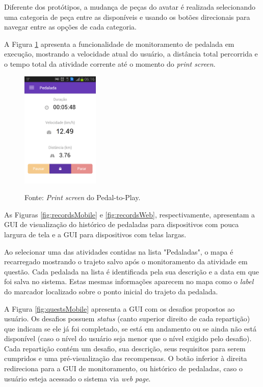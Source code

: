 Diferente dos protótipos, a mudança de peças do avatar é realizada selecionando uma categoria de peça entre as disponíveis e usando os botões direcionais para navegar entre as opções de cada categoria.
\par
A Figura \ref{fig:trackingMobile} apresenta a funcionalidade de monitoramento de pedalada em execução, mostrando a velocidade atual do usuário, a distância total percorrida e o tempo total da atividade corrente até o momento do \textit{print screen}.

\begin{figure}[h]
\begin{minipage}{1.0\textwidth}
    \centerline{\includegraphics[width=10em]{figuras/p2pTracking.png}}
    \label{fig:trackingMobile}
\end{minipage}
\centerline{Fonte: \textit{Print screen} do Pedal-to-Play.}
\end{figure}

As Figuras \ref{fig:recordsMobile} e \ref{fig:recordsWeb}, respectivamente, apresentam a GUI de visualização do histórico de pedaladas para dispositivos com pouca largura de tela e a GUI para dispositivos com telas largas. 
\par
Ao selecionar uma das atividades contidas na lista "Pedaladas", o mapa é recarregado mostrando o trajeto salvo após o monitoramento da atividade em questão. Cada pedalada na lista é identificada pela sua descrição e a data em que foi salva no sistema. Estas mesmas informações aparecem no mapa como o \textit{label} do marcador localizado sobre o ponto inicial do trajeto da pedalada.
\par
A Figura \ref{fig:questsMobile} apresenta a GUI com os desafios propostos ao usuário. Os desafios possuem \textit{status} (canto superior direito de cada repartição) que indicam se ele já foi completado, se está em andamento ou se ainda não está disponível (caso o nível do usuário seja menor que o nível exigido pelo desafio). Cada repartição contém um desafio, sua descrição, seus requisitos para serem cumpridos e uma pré-visualização das recompensas. O botão inferior à direita redireciona para a GUI de monitoramento, ou histórico de pedaladas, caso o usuário esteja acessado o sistema via \textit{web page}. 

